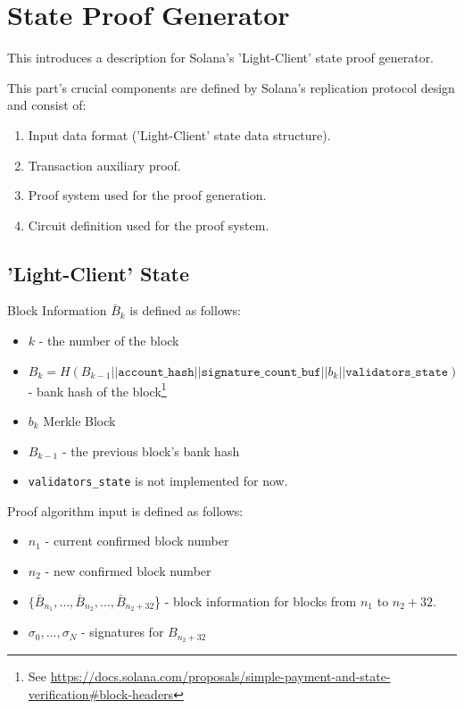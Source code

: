 \chapter{State Proof Generator}

This introduces a description for Solana's 'Light-Client' state proof generator.

This part's crucial components are defined by Solana's replication protocol
design and consist of:
\begin{enumerate}
    \item Input data format ('Light-Client' state data structure).
    \item Transaction auxiliary proof.
    \item Proof system used for the proof generation.
    \item Circuit definition used for the proof system.
\end{enumerate}

\section{'Light-Client' State}

Block Information $\bar B_k$ is defined as follows:
\begin{itemize}
    \item $k$ - the number of the block
    \item $B_k = H(B_{k - 1} || \texttt{account\_hash} || \texttt{signature\_count\_buf} || b_k || \texttt{validators\_state})$ - bank hash of the block\footnote{See \url{https://docs.solana.com/proposals/simple-payment-and-state-verification\#block-headers}}
    \item $b_k$ Merkle Block
    \item $B_{k - 1}$ - the previous block's bank hash
    \item \texttt{validators\_state} is not implemented for now. 
\end{itemize}

Proof algorithm input is defined as follows:
\begin{itemize}
    \item $n_1$ - current confirmed block number
    \item $n_2$ - new confirmed block number
    \item $\{\bar B_{n_1}, \dots, \bar B_{n_2}, \dots, \bar B_{n_2 + 32}$\} - block information for blocks from $n_1$ to $n_2 + 32$.
    \item $\sigma_0, \dots, \sigma_N$ - signatures for $B_{n_2 + 32}$
\end{itemize}

